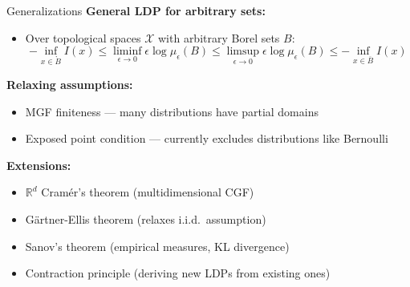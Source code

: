 \documentclass[aspectratio=169]{beamer}
\newcommand{\R}{\mathbb{R}}
\begin{document}
\begin{frame}{Generalizations}
  \textbf{General LDP for arbitrary sets:}
  \begin{itemize}
    \item Over topological spaces $\mathcal{X}$ with arbitrary Borel sets $B$:
      \[
        -\inf_{x \in \mathring{B}} I(x)
        \le \liminf_{\epsilon \to 0}\epsilon\log\mu_\epsilon(B)
        \le \limsup_{\epsilon \to 0}\epsilon\log\mu_\epsilon(B)
        \le -\inf_{x \in \overline{B}} I(x)
      \]
  \end{itemize}

  \vspace{0.2cm}
  \textbf{Relaxing assumptions:}
  \begin{itemize}
    \item MGF finiteness --- many distributions have partial domains
    \item Exposed point condition --- currently excludes distributions like Bernoulli
  \end{itemize}

  \vspace{0.2cm}
  \textbf{Extensions:}
  \begin{itemize}
    \item $\R^d$ Cram\'er's theorem (multidimensional CGF)
    \item G\"artner-Ellis theorem (relaxes i.i.d.\ assumption)
    \item Sanov's theorem (empirical measures, KL divergence)
    \item Contraction principle (deriving new LDPs from existing ones)
  \end{itemize}
\end{frame}
\end{document}
